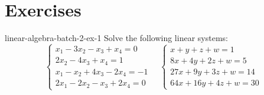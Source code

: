 \documentclass[preview]{standalone}
\begin{document}
\genpage

\section{Exercises}

\begin{snippetexercise}{linear-algebra-batch-2-ex-1}{}
    Solve the following linear systems:
    \[
        \begin{cases}
            x_1 - 3x_2 - x_3 + x_4 = 0 \\
            2x_2 - 4x_3 + x_4 = 1 \\
            x_1 - x_2 + 4x_3 - 2x_4 = -1 \\
            2x_1 - 2x_2 - x_3 + 2x_4 = 0
        \end{cases}
        \quad
        \begin{cases}
            x + y + z + w = 1 \\
            8x + 4y + 2z + w = 5 \\
            27x + 9y + 3z + w = 14 \\
            64x + 16y + 4z + w = 30
        \end{cases}
    \]
\end{snippetexercise}
\end{document}
